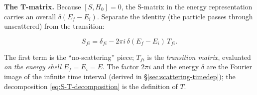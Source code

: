 \medskip\noindent\textbf{The T-matrix.} Because $[S,H_{0}]=0$, the S-matrix in the energy representation carries an overall $\delta(E_{f}-E_{i})$. Separate the identity (the particle passes through unscattered) from the transition:
\begin{linenomath}
\begin{equation}
S_{fi} = \delta_{fi} - 2\pi i\,\delta(E_{f}-E_{i})\,T_{fi}.
\label{eq:S-T-decomposition}
\end{equation}
\end{linenomath}
The first term is the ``no-scattering'' piece; $T_{fi}$ is the \emph{transition matrix}, evaluated \emph{on the energy shell} $E_{f}=E_{i}=E$. The factor $2\pi i$ and the energy $\delta$ are the Fourier image of the infinite time interval (derived in \S\ref{sec:scattering-timedep}); the decomposition \eqref{eq:S-T-decomposition} is the definition of $T$.

